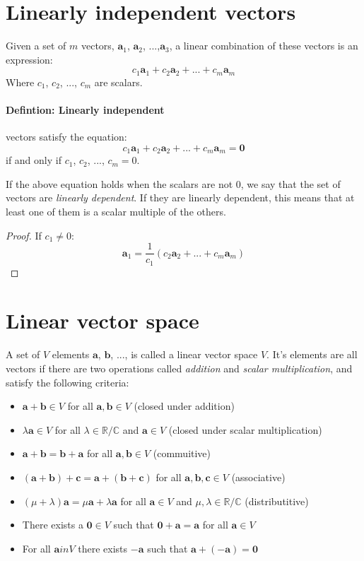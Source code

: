 \section{Linearly independent vectors}

Given a set of $m$ vectors, $\bm{a}_1$, $\bm{a}_2$, ...,$\bm{a}_3$, a linear
combination of these vectors is an expression:
$$
	c_1\bm{a}_1 + c_2\bm{a}_2 + ... + c_m\bm{a}_m
$$
Where $c_1$, $c_2$, ..., $c_m$ are scalars.

\paragraph{Defintion: Linearly independent} vectors satisfy the equation:
$$
	c_1\bm{a}_1 + c_2\bm{a}_2 + ... + c_m\bm{a}_m = \bm{0}
$$
if and only if $c_1$, $c_2$, ..., $c_m = 0$.
	
If the above equation holds when the scalars are not 0, we say that the set of
vectors are \emph{linearly dependent}. If they are linearly dependent, this
means that at least one of them is a scalar multiple of the others.
\begin{proof} 
If $c_1 \neq 0$:
$$
	\bm{a}_1 = \frac{1}{c_1}(c_2\bm{a}_2 + ... + c_m\bm{a}_m)
$$
\end{proof}

\section{Linear vector space}

A set of $V$ elements $\bm{a}$, $\bm{b}$, ..., is called a linear vector space
$V$. It's elements are all vectors if there are two operations called
\emph{addition} and \emph{scalar multiplication}, and satisfy the following
criteria:

\begin{itemize}
	\item $\bm{a} + \bm{b} \in V$ for all $\bm{a}, \bm{b} \in V$ (closed under
	addition)
	\item $\lambda\bm{a} \in V$ for all $\lambda \in \mathbb{R}/\mathbb{C}$ and
	$\bm{a} \in V$ (closed under scalar multiplication)
	\item $\bm{a} + \bm{b} = \bm{b} + \bm{a}$ for all $\bm{a}, \bm{b} \in V$ 
	(commuitive)
	\item $(\bm{a} + \bm{b}) + \bm{c} = \bm{a} + (\bm{b} + \bm{c})$ for all 
	$\bm{a}, \bm{b}, \bm{c} \in V$ (associative)
	\item $(\mu + \lambda)\bm{a} = \mu\bm{a} + \lambda\bm{a}$ for all $\bm{a}
	\in V$ and $\mu, \lambda \in \mathbb{R}/\mathbb{C}$ (distributitive)
	\item There exists a $\bm{0} \in V$ such that $\bm{0} + \bm{a} = \bm{a}$ for
	all $\bm{a} \in V$
	\item For all $\bm{a} in V$ there exists $-\bm{a}$ such that $\bm{a} + (-
	\bm{a}) = \bm{0}$
\end{itemize}

